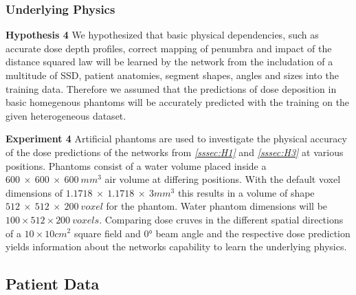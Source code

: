 \subsubsection{Underlying Physics}\label{sssec:H4}
\begin{hanginglist}\itemsep2pt

    \item\textbf{Hypothesis 4}\newline
    We hypothesized that basic physical dependencies, such as accurate dose depth profiles, correct mapping of penumbra and impact of the distance squared law will be learned by the network from the includation of a multitude of \acs{SSD}, patient anatomies, segment shapes, angles and sizes into the training data.
    Therefore we assumed that the predictions of dose deposition in basic homegenous phantoms will be accurately predicted with the training on the given heterogeneous dataset.\\

    \item\textbf{Experiment 4}\newline
    Artificial phantoms are used to investigate the physical accuracy of the dose predictions of the networks from \emph{\ref{sssec:H1} } and \emph{\ref{sssec:H3} } at various positions. Phantoms consist of a water volume placed inside a $600~\times~600~\times~600~mm^3$ air volume at differing positions. With the default voxel dimensions of $1.1718~\times~1.1718~\times~3mm^3$ this results in a volume of shape $512~\times~512~\times~200~voxel$ for the phantom. 
    Water phantom dimensions will be $100 \times 512 \times 200~voxels$.
    Comparing dose cruves in the different spatial directions of a $10 \times 10 cm^2$ square field and 0° beam angle and the respective dose prediction yields information about the networks capability to learn the underlying physics.\\

\end{hanginglist}

\subsection{Patient Data}

